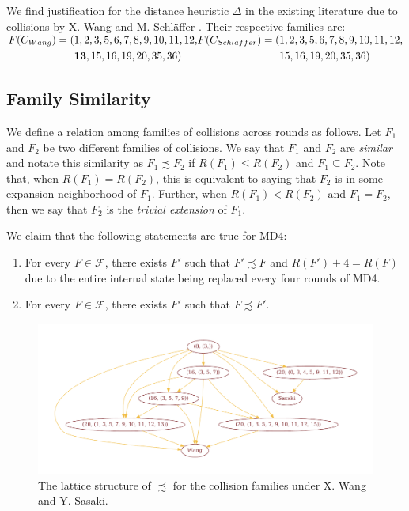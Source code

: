 \documentclass[conference]{IEEEtran}
\begin{document}
We find justification for the distance heuristic $\Delta$ in the existing
literature due to collisions by  X. Wang \cite{cryptoeprint:2004:199} and
M. Schl{\"a}ffer \cite{Schlaffer2006}. Their respective families are:
$
\begin{aligned}
F(C_{Wang}) = (& 1, 2, 3, 5, 6, 7, 8, 9, 10, 11, 12, \\
        & \textbf{13}, 15, 16, 19, 20, 35, 36) \\
\end{aligned} \\
\begin{aligned}
F(C_{Schlaffer}) = (& 1, 2, 3, 5, 6, 7, 8, 9, 10, 11, 12, \\
         & 15, 16, 19, 20, 35, 36)
\end{aligned}
$



\subsection{Family Similarity}

We define a relation among families of collisions across rounds as follows.
Let $F_1$ and $F_2$ be two different families of collisions. We say that
$F_1$ and $F_2$ are \textit{similar} and notate this similarity as $F_1 \precsim F_2$ if
$R(F_1) \leq R(F_2)$ and $F_1 \subseteq F_2$. Note that, when
$R(F_1) = R(F_2)$, this is equivalent to saying that $F_2$ is in some
expansion neighborhood of $F_1$. Further, when $R(F_1) < R(F_2)$ and
$F_1 = F_2$, then we say that $F_2$ is the \textit{trivial extension} of
$F_1$.

We claim that the following statements are true for MD4:
\begin{enumerate}
    \item For every $F \in \mathcal{F}$, there exists $F'$ such that
        $F' \precsim F$ and $R(F') + 4 = R(F)$ due to the entire
        internal state being replaced every four rounds of MD4.
    \item For every $F \in \mathcal{F}$, there exists $F'$ such that
        $F \precsim F'$.
\end{enumerate}

\begin{figure}
\begin{center}
\includegraphics[width=\textwidth]{Figs/lattice.pdf}
\caption{The lattice structure of $\precsim$ for the collision
  families under X. Wang and Y. Sasaki.}
\label{Fig:PrecSim}
\end{center}
\end{figure}
\end{document}
